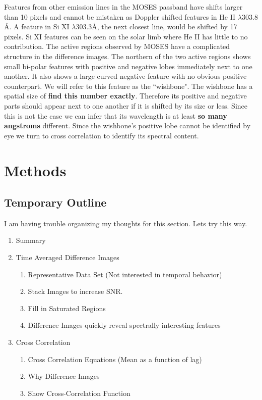 \documentclass[]{solarphysics}
\begin{document}
\begin{article}
	Features from other emission lines in the MOSES passband have shifts larger than 10 pixels and cannot be mistaken as Doppler shifted features in He II $\lambda303.8$ \AA. A feature in Si XI $\lambda$303.3\AA , the next closest line, would be shifted by 17 pixels. Si XI features can be seen on the solar limb where He II has little to no contribution. The active regions observed by MOSES have a complicated structure in the difference images.  The northern of the two active regions shows small bi-polar features with positive and negative lobes immediately next to one another.  It also shows a large curved negative feature with no obvious positive counterpart.  We will refer to this feature as the ``wishbone".  The wishbone has a spatial size of \textbf{find this number exactly}.  Therefore its positive and negative parts should appear next to one another if it is shifted by its size or less.  Since this is not the case we can infer that its wavelength is at least \textbf{so many angstroms} different.  Since the wishbone's positive lobe cannot be identified by eye we turn to cross correlation to identify its spectral content.
	

	
	
	

\section{Methods}
	\subsection{Temporary Outline}
		I am having trouble organizing my thoughts for this section.  Lets try this way.
		\begin{enumerate}
			\item Summary
			\item Time Averaged Difference Images
				\begin{enumerate}
					\item Representative Data Set (Not interested in temporal behavior)
					\item Stack Images to increase SNR.
					\item Fill in Saturated Regions
					\item Difference Images quickly reveal spectrally interesting features
				\end{enumerate}
			
			\item Cross Correlation
				\begin{enumerate}
					\item Cross Correlation Equations (Mean as a function of lag)
					\item Why Difference Images
					\item Show Cross-Correlation Function
				\end{enumerate}
			

\end{enumerate}
\end{article}
\end{document}
